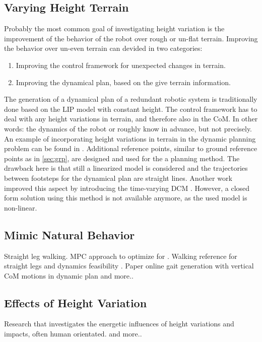 \subsection{Varying Height Terrain}
Probably the most common goal of investigating height variation is the improvement of the behavior of the robot over rough or un-flat terrain. Improving the behavior over un-even terrain can devided in two categories:
\begin{enumerate}
	\item Improving the control framework for unexpected changes in terrain.
	\item Improving the dynamical plan, based on the give terrain information.
\end{enumerate} 
The generation of a dynamical plan of a redundant robotic system is traditionally done based on the \ac{LIP} model with constant height. The control framework has to deal with any height variations in terrain, and therefore also in the \ac{CoM}. In other words: the dynamics of the robot or roughly know in advance, but not precisely.\\
An example of incorporating height variations in terrain in the dynamic planning problem can be found in \cite{englsberger2013three}. Additional reference points, similar to ground reference points as in \ref{sec:grp}, are designed and used for the a planning method. The drawback here is that still a linearized model is considered and the trajectories between footsteps for the dynamical plan are straight lines. Another work improved this aspect by introducing the time-varying \ac{DCM} \cite{hopkins2014humanoid}. However, a closed form solution using this method is not available anymore, as the used model is non-linear.
\subsection{Mimic Natural Behavior}
Straight leg walking. MPC approach to optimize for \cite{brasseur2015robust}. Walking reference for straight legs and dynamics feasibility \cite{kajita2017biped}. Paper online gait generation with vertical \ac{CoM} motions in dynamic plan \cite{terada2007online}
\cite{you2016straight} \cite{griffin2018straight} and more..
\subsection{Effects of Height Variation}
Research that investigates the energetic influences of height variations and impacts, often human orientated.
\cite{kuo2005energetic} \cite{lee1998determinants} \cite{gao2017increase} and more..
